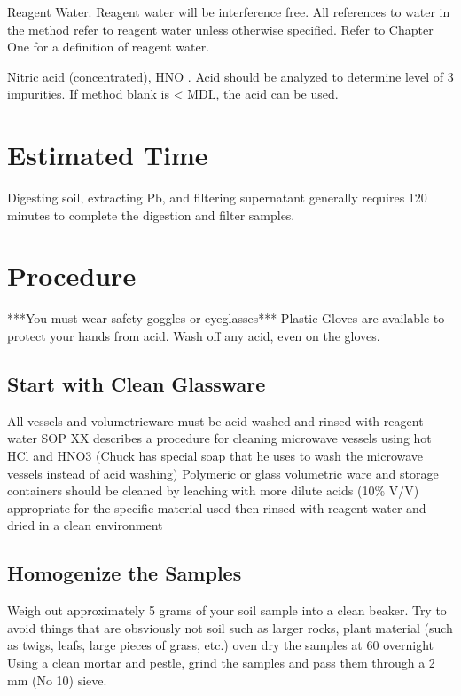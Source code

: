 \documentclass[12pt]{../SOP3_beta}\usepackage[]{graphicx}\usepackage[]{color}
\begin{document}
\NP Reagent Water. Reagent water will be interference free. All references to water in
the method refer to reagent water unless otherwise specified. Refer to Chapter One for a definition
of reagent water.

\NP Nitric acid (concentrated), HNO . Acid should be analyzed to determine level of 3
impurities. If method blank is < MDL, the acid can be used. 


\section{Estimated Time}

\NP Digesting soil, extracting Pb, and filtering supernatant  generally requires 120 minutes to complete the digestion and filter samples.


\section{Procedure}


***You must wear safety goggles or eyeglasses***
Plastic Gloves are available to protect your hands from acid. Wash off any acid, even on the gloves.

\subsection{Start with Clean Glassware}

  \NP All vessels and volumetricware must be acid washed and rinsed with reagent water
  \NP SOP XX describes a procedure for cleaning microwave vessels using hot HCl and HNO3 (Chuck has special soap that he uses to wash the microwave vessels instead of acid washing)
  \NP Polymeric or glass volumetric ware and storage containers should be cleaned by leaching with more dilute acids (10\% V/V) appropriate for the specific material used then rinsed with reagent water and dried in a clean environment

\subsection{Homogenize the Samples}

  \NP Weigh out approximately 5 grams of your soil sample into a clean beaker. Try to avoid things that are obsviously not soil such as larger rocks, plant material (such as twigs, leafs, large pieces of grass, etc.)
  \NP oven dry the samples at 60 \celsius overnight
  \NP Using a clean mortar and pestle, grind the samples and pass them through a 2 mm (No 10) sieve. 
  
\end{document}
